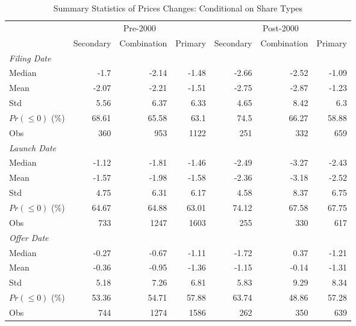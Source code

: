 \documentclass[11pt]{article}
\begin{document}
\begin{table}[htbp]
	\centering
	\caption{Summary Statistics of Prices Changes: Conditional on Share Types}
	\begin{tabular}{lrrrrrr}
		\toprule
		& \multicolumn{3}{c}{Pre-2000} & \multicolumn{3}{c}{Post-2000} \\
		& \multicolumn{1}{l}{Secondary} & \multicolumn{1}{l}{Combination} & \multicolumn{1}{l}{Primary} & \multicolumn{1}{l}{Secondary} & \multicolumn{1}{l}{Combination} & \multicolumn{1}{l}{Primary}\\
		\midrule
		\multicolumn{7}{l}{\textit{Filing Date}}\\
		Median & -1.7  & -2.14 & -1.48 & -2.66 & -2.52 & -1.09 \\
		Mean  & -2.07 & -2.21 & -1.51 & -2.75 & -2.87 & -1.23 \\
		Std   & 5.56  & 6.37  & 6.33  & 4.65  & 8.42  & 6.3 \\
		$ Pr(\leq 0) $ (\%) & 68.61 & 65.58 & 63.1  & 74.5  & 66.27 & 58.88 \\
		Obs   & 360   & 953   & 1122  & 251   & 332   & 659\\
		\midrule
		\multicolumn{7}{l}{\textit{Launch Date}}\\
		Median & -1.12 & -1.81 & -1.46 & -2.49 & -3.27 & -2.43 \\
		Mean  & -1.57 & -1.98 & -1.58 & -2.36 & -3.18 & -2.52 \\
		Std   & 4.75  & 6.31  & 6.17  & 4.58  & 8.37  & 6.75 \\
		$ Pr(\leq 0) $ (\%) & 64.67 & 64.88 & 63.01 & 74.12 & 67.58 & 67.75 \\
		Obs   & 733   & 1247  & 1603  & 255   & 330   & 617 \\
		\midrule
		\multicolumn{7}{l}{\textit{Offer Date}}\\
		Median & -0.27 & -0.67 & -1.11 & -1.72 & 0.37  & -1.21 \\
		Mean  & -0.36 & -0.95 & -1.36 & -1.15 & -0.14 & -1.31 \\
		Std   & 5.18  & 7.26  & 6.81  & 5.83  & 9.29  & 8.34 \\
		$ Pr(\leq 0) $ (\%) & 53.36 & 54.71 & 57.88 & 63.74 & 48.86 & 57.28 \\
		Obs   & 744   & 1274  & 1586  & 262   & 350   & 639\\
		\bottomrule
	\end{tabular}%
	\label{tab:addlabel}%
\end{table}%
\end{document}
